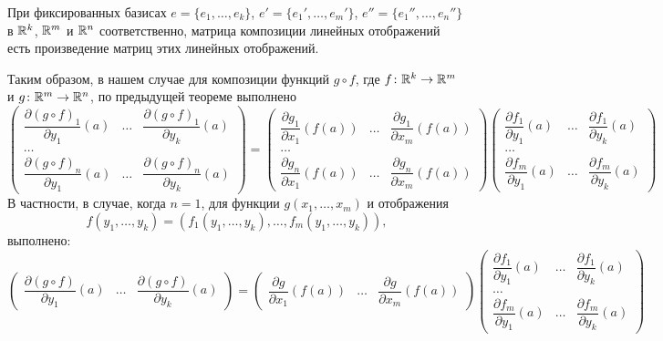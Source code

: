 \documentclass[a4paper]{article}
\theoremstyle{named}
\begin{document}
    \begin{remark*}
        При фиксированных базисах $e=\{e_1,\ldots, e_k\}$, $e'=\{e_1',\ldots, e_m'\}$, $e''=\{e_1'',\ldots, e_n''\}$
        в $\mathbb{R}^k$, $\mathbb{R}^m$ и $\mathbb{R}^n$ соответственно, матрица композиции линейных отображений есть произведение матриц этих линейных отображений.

        Таким образом, в нашем случае для композиции функций $g\circ f$, где $f\colon \mathbb{R}^k\to \mathbb{R}^m$ и $g\colon \mathbb{R}^m\to \mathbb{R}^n$, по предыдущей теореме выполнено
        $$
            \begin{pmatrix}
                \dfrac{\partial (g\circ f)_1}{\partial y_1}(a) & \ldots & \dfrac{\partial (g\circ f)_1}{\partial y_k}(a) \\
                \ldots \\
                \dfrac{\partial (g\circ f)_n}{\partial y_1}(a) & \ldots & \dfrac{\partial (g\circ f)_n}{\partial y_k}(a)
            \end{pmatrix}
            =
            \begin{pmatrix}
                \dfrac{\partial g_1}{\partial x_1}(f(a)) & \ldots & \dfrac{\partial g_1}{\partial x_m}(f(a)) \\
                \ldots \\
                \dfrac{\partial g_n}{\partial x_1}(f(a)) & \ldots & \dfrac{\partial g_n}{\partial x_m}(f(a))
            \end{pmatrix}
            \begin{pmatrix}
                \dfrac{\partial f_1}{\partial y_1}(a) & \ldots & \dfrac{\partial f_1}{\partial y_k}(a) \\
                \ldots \\
                \dfrac{\partial f_m}{\partial y_1}(a) & \ldots & \dfrac{\partial f_m}{\partial y_k}(a)
            \end{pmatrix}
        $$
        В частности, в случае, когда $n=1$, для функции $g(x_1,\ldots, x_m)$ и отображения
        $$f(y_1,\ldots, y_k) = (f_1(y_1,\ldots, y_k),\ldots, f_m(y_1,\ldots, y_k)),$$ выполнено:
        $$
            \begin{pmatrix}
                \dfrac{\partial (g\circ f)}{\partial y_1}(a) & \ldots & \dfrac{\partial (g\circ f)}{\partial y_k}(a)
            \end{pmatrix}
            =
            \begin{pmatrix}
                \dfrac{\partial g}{\partial x_1}(f(a)) & \ldots & \dfrac{\partial g}{\partial x_m}(f(a))
            \end{pmatrix}
            \begin{pmatrix}
                \dfrac{\partial f_1}{\partial y_1}(a) & \ldots & \dfrac{\partial f_1}{\partial y_k}(a) \\
                \ldots \\
                \dfrac{\partial f_m}{\partial y_1}(a) & \ldots & \dfrac{\partial f_m}{\partial y_k}(a)
            \end{pmatrix}
        $$


\end{remark*}
\end{document}
